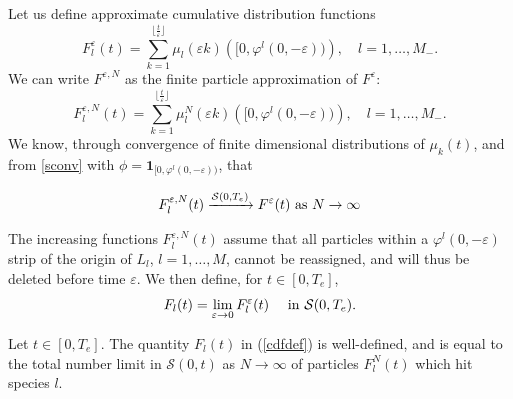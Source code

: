 Let us define approximate cumulative distribution functions  
\begin{equation}
F_l^\varepsilon(t) = \sum_{k = 1}^{\lfloor \frac t\varepsilon \rfloor} \mu_l(\varepsilon k)\left([0,\varphi^l(0,-\varepsilon))\right), \quad l = 1, \dots, M_-.
\end{equation}
We can write $F^{\varepsilon,N}$ as the finite particle approximation of $F^{\varepsilon}$:
\begin{equation}
F_l^{\varepsilon,N}(t) = \sum_{k = 1}^{\lfloor \frac t\varepsilon \rfloor} \mu_l^N(\varepsilon k)\left([0,\varphi^l(0,-\varepsilon))\right), \quad l = 1, \dots, M_-.
\end{equation}
  We know, through convergence of finite dimensional distributions of $\mu_k(t)$, and from \ref{sconv} with $\phi = \mathbf 1_{[0,\varphi^l(0,-\varepsilon))}$, that

\begin{equation}
F_l^{\varepsilon,N}(t)\xrightarrow{\mathcal S(0,T_e)}  F^\varepsilon(t) \hbox{ as } N\rightarrow \infty
\end{equation}

The increasing functions $F_l^{\varepsilon,N}(t)$  assume that all particles within a $\varphi^l(0,-\varepsilon)$ strip of the origin of $L_l$, $l = 1, \dots, M$,  cannot be reassigned, and will thus be deleted before time $\varepsilon$. We then define, for $t \in [0,T_e]$,
\begin{equation}\label{cdfdef}
F_l(t) = \lim_{\varepsilon \rightarrow 0} F_l^\varepsilon(t) \quad \hbox{ in }\mathcal  S(0,T_e).  \end{equation}


\begin{theorem}\label{trace} Let $t\in [0,T_e]$. The quantity $F_l(t)$ in (\ref{cdfdef}) is well-defined, and is equal to the total number limit in $\mathcal  S(0,t)$  as $N \rightarrow \infty$ of particles $F^N_l(t)$ which hit species $l$.
\end{theorem}

